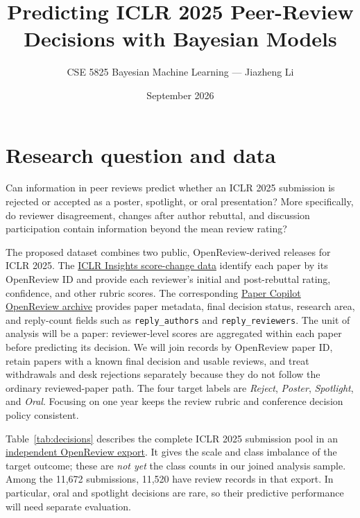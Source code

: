 \documentclass[11pt]{article}
\title{Predicting ICLR 2025 Peer-Review Decisions with Bayesian Models}
\author{CSE 5825 Bayesian Machine Learning --- Jiazheng Li}
\date{September 2026}
\begin{document}
\maketitle

\section*{Research question and data}
Can information in peer reviews predict whether an ICLR 2025 submission is rejected or accepted as a poster, spotlight, or oral presentation? More specifically, do reviewer disagreement, changes after author rebuttal, and discussion participation contain information beyond the mean review rating?

The proposed dataset combines two public, OpenReview-derived releases for ICLR 2025. The \href{https://github.com/papercopilot/iclr-insights}{ICLR Insights score-change data} identify each paper by its OpenReview ID and provide each reviewer's initial and post-rebuttal rating, confidence, and other rubric scores. The corresponding \href{https://github.com/papercopilot/openreview}{Paper Copilot OpenReview archive} provides paper metadata, final decision status, research area, and reply-count fields such as \texttt{reply\_authors} and \texttt{reply\_reviewers}. The unit of analysis will be a paper: reviewer-level scores are aggregated within each paper before predicting its decision. We will join records by OpenReview paper ID, retain papers with a known final decision and usable reviews, and treat withdrawals and desk rejections separately because they do not follow the ordinary reviewed-paper path. The four target labels are \emph{Reject}, \emph{Poster}, \emph{Spotlight}, and \emph{Oral}. Focusing on one year keeps the review rubric and conference decision policy consistent.

Table~\ref{tab:decisions} describes the complete ICLR 2025 submission pool in an \href{https://huggingface.co/datasets/demfier/reviewertoo-iclr2025}{independent OpenReview export}. It gives the scale and class imbalance of the target outcome; these are \emph{not yet} the class counts in our joined analysis sample. Among the 11,672 submissions, 11,520 have review records in that export. In particular, oral and spotlight decisions are rare, so their predictive performance will need separate evaluation.
\end{document}
